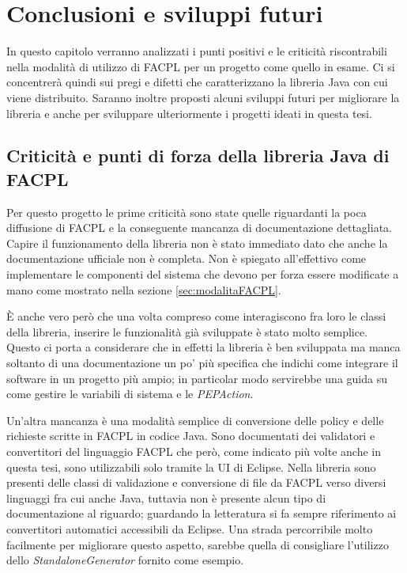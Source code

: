 
\chapter{Conclusioni e sviluppi futuri}
In questo capitolo verranno analizzati i punti positivi e le criticità riscontrabili nella modalità di utilizzo di FACPL per un progetto come quello in esame. Ci si concentrerà quindi sui pregi e difetti che caratterizzano la libreria Java con cui viene distribuito. Saranno inoltre proposti alcuni sviluppi futuri per migliorare la libreria e anche per sviluppare ulteriormente i progetti ideati in questa tesi.

\section{Criticità e punti di forza della libreria Java di FACPL}
Per questo progetto le prime criticità sono state quelle riguardanti la poca diffusione di FACPL e la conseguente mancanza di documentazione dettagliata. Capire il funzionamento della libreria non è stato immediato dato che anche la documentazione ufficiale non è completa. Non è spiegato all'effettivo come implementare le componenti del sistema che devono per forza essere modificate a mano come mostrato nella sezione \ref{sec:modalitaFACPL}.\par
È anche vero però che una volta compreso come interagiscono fra loro le classi della libreria, inserire le funzionalità già sviluppate è stato molto semplice. Questo ci porta a considerare che in effetti la libreria è ben sviluppata ma manca soltanto di una documentazione un po' più specifica che indichi come integrare il software in un progetto più ampio; in particolar modo servirebbe una guida su come gestire le variabili di sistema e le \emph{PEPAction}.\par
Un'altra mancanza è una modalità semplice di conversione delle policy e delle richieste scritte in FACPL in codice Java. Sono documentati dei validatori e convertitori del linguaggio FACPL che però, come indicato più volte anche in questa tesi, sono utilizzabili solo tramite la UI di Eclipse. Nella libreria sono presenti delle classi di validazione e conversione di file da FACPL verso diversi linguaggi fra cui anche Java, tuttavia non è presente alcun tipo di documentazione al riguardo; guardando la letteratura si fa sempre riferimento ai convertitori automatici accessibili da Eclipse. Una strada percorribile molto facilmente per migliorare questo aspetto, sarebbe quella di consigliare l'utilizzo dello \emph{StandaloneGenerator} fornito come esempio.\par
